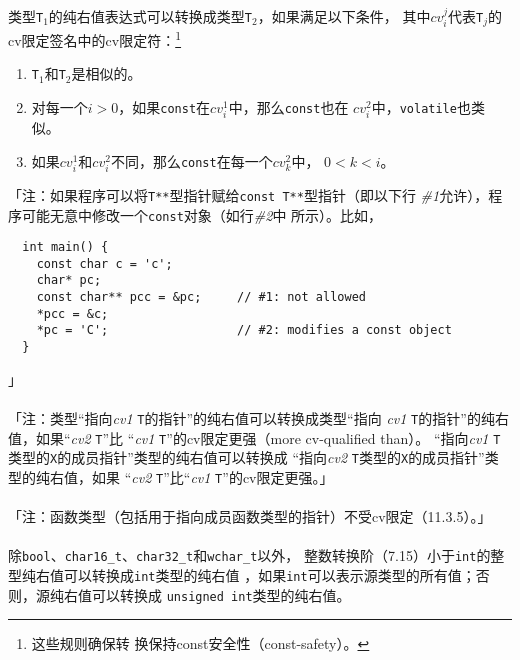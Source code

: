 \paragraph{}
类型\texttt{T$_1$}的纯右值表达式可以转换成类型\texttt{T$_2$}，如果满足以下条件，
其中$cv_i^j$代表\texttt{T$_j$}的cv限定签名中的cv限定符：\footnote{这些规则确保转
换保持const安全性（const-safety）。}
\begin{enumerate}
  \item{\texttt{T$_1$}和\texttt{T$_2$}是相似的。}
  \item{对每一个$i > 0$，如果\texttt{const}在$cv_i^1$中，那么\texttt{const}也在
    $cv_i^2$中，\texttt{volatile}也类似。}
  \item{如果$cv_i^1$和$cv_i^2$不同，那么\texttt{const}在每一个$cv_k^2$中，
    $0 < k < i$。}
\end{enumerate}
「注：如果程序可以将\texttt{T**}型指针赋给\texttt{const T**}型指针（即以下行
\textit{\#1}允许），程序可能无意中修改一个\texttt{const}对象（如行\textit{\#2}中
所示）。比如，
\begin{lstlisting}
  int main() {
    const char c = 'c';
    char* pc;
    const char** pcc = &pc;     // #1: not allowed
    *pcc = &c;
    *pc = 'C';                  // #2: modifies a const object
  }
\end{lstlisting}」

\paragraph{}
「注：类型``指向\textit{cv1} \texttt{T}的指针''的纯右值可以转换成类型``指向
\textit{cv1} \texttt{T}的指针''的纯右值，如果``\textit{cv2} \texttt{T}''比
``\textit{cv1} \texttt{T}''的cv限定更强（more cv-qualified than）。
``指向\textit{cv1} \texttt{T}类型的\texttt{X}的成员指针''类型的纯右值可以转换成
``指向\textit{cv2} \texttt{T}类型的\texttt{X}的成员指针''类型的纯右值，如果
``\textit{cv2} \texttt{T}''比``\textit{cv1} \texttt{T}''的cv限定更强。」

\paragraph{}
「注：函数类型（包括用于指向成员函数类型的指针）不受cv限定（11.3.5）。」

\paragraph{}
除\texttt{bool}、\texttt{char16\_t}、\texttt{char32\_t}和\texttt{wchar\_t}以外，
整数转换阶（7.15）小于\texttt{int}的整型纯右值可以转换成\texttt{int}类型的纯右值
，如果\texttt{int}可以表示源类型的所有值；否则，源纯右值可以转换成
\texttt{unsigned int}类型的纯右值。

